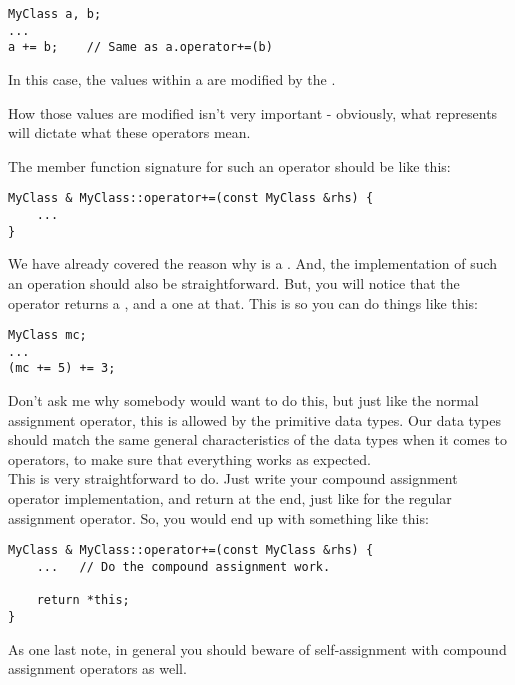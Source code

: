 \begin{verbatim}
MyClass a, b;
...
a += b;    // Same as a.operator+=(b)
\end{verbatim}

In this case, the values within a are modified by the .

How those values are modified isn't very important - obviously, what  represents will dictate what these operators mean.

The member function signature for such an operator should be like this:

\begin{verbatim}
MyClass & MyClass::operator+=(const MyClass &rhs) {
    ...
}
\end{verbatim}

We have already covered the reason why  is a . And, the implementation of such an operation should also be straightforward. But, you will notice that the operator returns a , and a  one at that. This is so you can do things like this:

\begin{verbatim}
MyClass mc;
...
(mc += 5) += 3;
\end{verbatim}

Don't ask me why somebody would want to do this, but just like the normal assignment operator, this is allowed by the primitive data types. Our  data types should match the same general characteristics of the  data types when it comes to operators, to make sure that everything works as expected.\\

This is very straightforward to do. Just write your compound assignment operator implementation, and return  at the end, just like for the regular assignment operator. So, you would end up with something like this:

\begin{verbatim}
MyClass & MyClass::operator+=(const MyClass &rhs) {
    ...   // Do the compound assignment work.
    
    return *this;
}
\end{verbatim}

As one last note, in general you should beware of self-assignment with compound assignment operators as well. 


